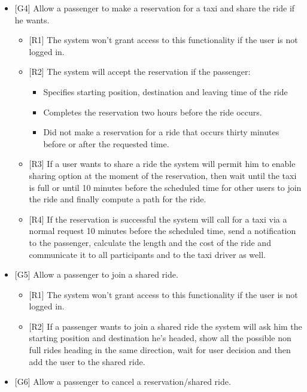 \begin{itemize}
\begin{itemize}
\begin{itemize}
		\end{itemize}
	\end{itemize}
		\item {[G4]} Allow a passenger to make a reservation for a taxi and share the ride if he wants.
			\begin{itemize}
				\item {[R1]} The system won't grant access to this functionality if the user is not logged in.
				\item {[R2]} The system will accept the reservation if the passenger: 
				\begin{itemize}
					\item Specifies starting position, destination and leaving time of the ride
					\item Completes the reservation two hours before the ride occurs.
					\item Did not make a reservation for a ride that occurs thirty minutes before or after the requested time.					
				\end{itemize}
				\item {[R3]} If a user wants to share a ride the system will permit him to enable sharing option at the moment of the reservation, then wait until the taxi is full or until 10 minutes before the scheduled time for other users to join the ride and finally compute a path for the ride.
				\item {[R4]} If the reservation is successful the system will call for a taxi via a normal request 10 minutes before the scheduled time, send a notification to the passenger, calculate the length and the cost of the ride and communicate it to all participants and to the taxi driver as well.
			\end{itemize}
		\item {[G5]} Allow a passenger to join a shared ride.
			\begin{itemize}
				\item {[R1]} The system won't grant access to this functionality if the user is not logged in.
				\item {[R2]} If a passenger wants to join a shared ride the system will ask him the starting position and destination he's headed, show all the possible non full rides heading in the same direction, wait for user decision and then add the user to the shared ride.
			\end{itemize}
		\item {[G6]} Allow a passenger to cancel a reservation/shared ride.
			\begin{itemize}

\end{itemize}
\end{itemize}
